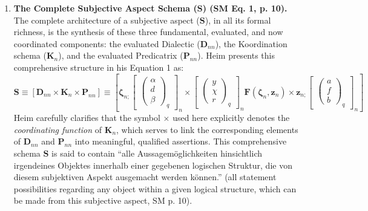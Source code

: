 \documentclass[12pt]{article}
\newcommand{\q}[1]{\enquote{#1}}
\begin{document}
\begin{enumerate}
    \item \textbf{The Complete Subjective Aspect Schema (\( \mathbf{S} \)) (SM Eq. 1, p. 10).}
    The complete architecture of a subjective aspect (\(\mathbf{S}\)), in all its formal richness, is the synthesis of these three fundamental, evaluated, and now coordinated components: the evaluated Dialectic (\(\mathbf{D}_{nn}\)), the Koordination schema (\(\mathbf{K}_n\)), and the evaluated Predicatrix (\(\mathbf{P}_{nn}\)). Heim presents this comprehensive structure in his Equation 1 as:
        \begin{equation}
        \mathbf{S} \equiv \left[ \mathbf{D}_{nn} \times \mathbf{K}_n \times \mathbf{P}_{nn} \right] \equiv \left[ \bm{\zeta}_{n;} \begin{bmatrix} \begin{pmatrix} \alpha \\ d \\ \beta \end{pmatrix}_q \end{bmatrix}_n \times \begin{bmatrix} \begin{pmatrix} y \\ \chi \\ r \end{pmatrix}_q \end{bmatrix}_n \mathbf{F}(\bm{\zeta}_{n}, \mathbf{z}_n) \times \mathbf{z}_{n;} \begin{bmatrix} \begin{pmatrix} a \\ f \\ b \end{pmatrix}_q \end{bmatrix}_n \right] \tag{1}
        \label{eq:original_subjective_aspect}
        \end{equation}
    Heim carefully clarifies that the symbol \( \times \) used here explicitly denotes the \textit{coordinating function} of \( \mathbf{K}_n \), which serves to link the corresponding elements of \( \mathbf{D}_{nn} \) and \( \mathbf{P}_{nn} \) into meaningful, qualified assertions. This comprehensive schema \( \mathbf{S} \) is said to contain \q{alle Aussagemöglichkeiten hinsichtlich irgendeines Objektes innerhalb einer gegebenen logischen Struktur, die von diesem subjektiven Aspekt ausgemacht werden können.} (all statement possibilities regarding any object within a given logical structure, which can be made from this subjective aspect, SM p. 10).
\end{enumerate}
\end{document}
